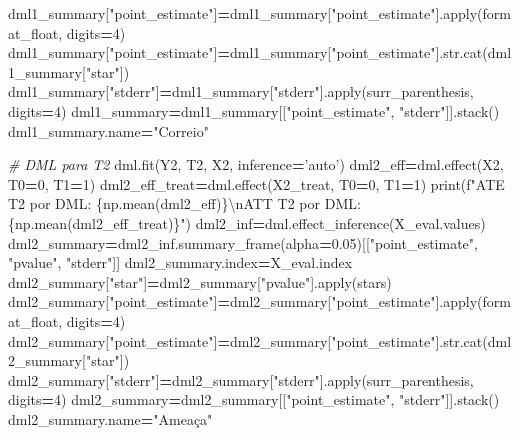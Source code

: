\documentclass[
]{article}
\newenvironment{Shaded}{\begin{snugshade}}{\end{snugshade}}
\newcommand{\BuiltInTok}[1]{#1}
\newcommand{\CharTok}[1]{\textcolor[rgb]{0.31,0.60,0.02}{#1}}
\newcommand{\CommentTok}[1]{\textcolor[rgb]{0.56,0.35,0.01}{\textit{#1}}}
\newcommand{\DecValTok}[1]{\textcolor[rgb]{0.00,0.00,0.81}{#1}}
\newcommand{\FloatTok}[1]{\textcolor[rgb]{0.00,0.00,0.81}{#1}}
\newcommand{\NormalTok}[1]{#1}
\newcommand{\OperatorTok}[1]{\textcolor[rgb]{0.81,0.36,0.00}{\textbf{#1}}}
\newcommand{\SpecialCharTok}[1]{\textcolor[rgb]{0.00,0.00,0.00}{#1}}
\newcommand{\SpecialStringTok}[1]{\textcolor[rgb]{0.31,0.60,0.02}{#1}}
\newcommand{\StringTok}[1]{\textcolor[rgb]{0.31,0.60,0.02}{#1}}
\begin{document}
\begin{Shaded}
\begin{Highlighting}[]
{\NormalTok{dml1_summary[}\StringTok{"point_estimate"}\NormalTok{]}\OperatorTok{=}\NormalTok{dml1_summary[}\StringTok{"point_estimate"}\NormalTok{].}\BuiltInTok{apply}\NormalTok{(format_float, digits}\OperatorTok{=}\DecValTok{4}\NormalTok{)}
\NormalTok{dml1_summary[}\StringTok{"point_estimate"}\NormalTok{]}\OperatorTok{=}\NormalTok{dml1_summary[}\StringTok{"point_estimate"}\NormalTok{].}\BuiltInTok{str}\NormalTok{.cat(dml1_summary[}\StringTok{"star"}\NormalTok{])}
\NormalTok{dml1_summary[}\StringTok{"stderr"}\NormalTok{]}\OperatorTok{=}\NormalTok{dml1_summary[}\StringTok{"stderr"}\NormalTok{].}\BuiltInTok{apply}\NormalTok{(surr_parenthesis, digits}\OperatorTok{=}\DecValTok{4}\NormalTok{)}
\NormalTok{dml1_summary}\OperatorTok{=}\NormalTok{dml1_summary[[}\StringTok{"point_estimate"}\NormalTok{, }\StringTok{"stderr"}\NormalTok{]].stack()}
\NormalTok{dml1_summary.name}\OperatorTok{=}\StringTok{"Correio"}

\CommentTok{# DML para T2}
\NormalTok{dml.fit(Y2, T2, X2, inference}\OperatorTok{=}\StringTok{'auto'}\NormalTok{)}
\NormalTok{dml2_eff}\OperatorTok{=}\NormalTok{dml.effect(X2, T0}\OperatorTok{=}\DecValTok{0}\NormalTok{, T1}\OperatorTok{=}\DecValTok{1}\NormalTok{)}
\NormalTok{dml2_eff_treat}\OperatorTok{=}\NormalTok{dml.effect(X2_treat, T0}\OperatorTok{=}\DecValTok{0}\NormalTok{, T1}\OperatorTok{=}\DecValTok{1}\NormalTok{)}
\BuiltInTok{print}\NormalTok{(}\SpecialStringTok{f"ATE T2 por DML: }\SpecialCharTok{\{np.}\NormalTok{mean(dml2_eff)}\SpecialCharTok{\}}\CharTok{\textbackslash{}n}\SpecialStringTok{ATT T2 por DML: }\SpecialCharTok{\{np.}\NormalTok{mean(dml2_eff_treat)}\SpecialCharTok{\}}\SpecialStringTok{"}\NormalTok{)}
\NormalTok{dml2_inf}\OperatorTok{=}\NormalTok{dml.effect_inference(X_eval.values)}
\NormalTok{dml2_summary}\OperatorTok{=}\NormalTok{dml2_inf.summary_frame(alpha}\OperatorTok{=}\FloatTok{0.05}\NormalTok{)[[}\StringTok{"point_estimate"}\NormalTok{, }\StringTok{"pvalue"}\NormalTok{, }\StringTok{"stderr"}\NormalTok{]]}
\NormalTok{dml2_summary.index}\OperatorTok{=}\NormalTok{X_eval.index}
\NormalTok{dml2_summary[}\StringTok{"star"}\NormalTok{]}\OperatorTok{=}\NormalTok{dml2_summary[}\StringTok{"pvalue"}\NormalTok{].}\BuiltInTok{apply}\NormalTok{(stars)}
\NormalTok{dml2_summary[}\StringTok{"point_estimate"}\NormalTok{]}\OperatorTok{=}\NormalTok{dml2_summary[}\StringTok{"point_estimate"}\NormalTok{].}\BuiltInTok{apply}\NormalTok{(format_float, digits}\OperatorTok{=}\DecValTok{4}\NormalTok{)}
\NormalTok{dml2_summary[}\StringTok{"point_estimate"}\NormalTok{]}\OperatorTok{=}\NormalTok{dml2_summary[}\StringTok{"point_estimate"}\NormalTok{].}\BuiltInTok{str}\NormalTok{.cat(dml2_summary[}\StringTok{"star"}\NormalTok{])}
\NormalTok{dml2_summary[}\StringTok{"stderr"}\NormalTok{]}\OperatorTok{=}\NormalTok{dml2_summary[}\StringTok{"stderr"}\NormalTok{].}\BuiltInTok{apply}\NormalTok{(surr_parenthesis, digits}\OperatorTok{=}\DecValTok{4}\NormalTok{)}
\NormalTok{dml2_summary}\OperatorTok{=}\NormalTok{dml2_summary[[}\StringTok{"point_estimate"}\NormalTok{, }\StringTok{"stderr"}\NormalTok{]].stack()}
\NormalTok{dml2_summary.name}\OperatorTok{=}\StringTok{"Ameaça"}

}
\end{Highlighting}
\end{Shaded}
\end{document}
